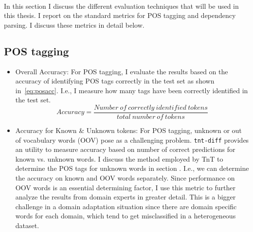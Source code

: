 ~

In this section I discuss the different evaluation techniques that will be used in this thesis. I report on the standard metrics for POS tagging and dependency parsing. I discuss these metrics in detail below.


\subsection{POS tagging}
    \begin{itemize}
        \item Overall Accuracy: For POS tagging, I evaluate the results based on the accuracy of identifying POS tags correctly in the test set as shown in~\ref{eq:posacc}. I.e., I measure how many tags have been correctly identified in the test set.
        \begin{equation} \label{eq:posacc}
            Accuracy = \frac{Number\ of\ correctly\ identified\ tokens}{total\ number\ of\ tokens}
        \end{equation}
        \item Accuracy for Known \& Unknown tokens: For POS tagging, unknown or out of vocabulary words (OOV) pose as a challenging problem. \texttt{tnt-diff} provides an utility to measure accuracy based on number of correct predictions for known vs. unknown words. I discuss the method employed by TnT to determine the POS tags for unknown words in section . I.e., we can determine the accuracy on known and OOV words separately. Since performance on OOV words is an essential determining factor, I use this metric to further analyze the results from domain experts in greater detail. This is a bigger challenge in a domain adaptation situation since there are domain specific words for each domain, which tend to get misclassified in a heterogeneous dataset.
    \end{itemize}

